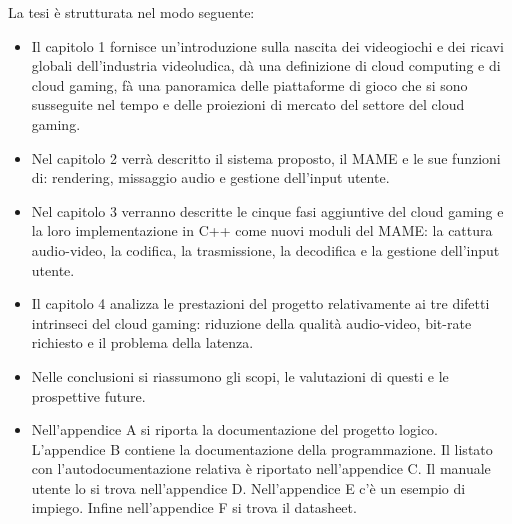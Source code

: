 
La tesi è strutturata nel modo seguente:
\begin{itemize}
	\item Il capitolo 1 fornisce un'introduzione sulla nascita dei videogiochi e dei ricavi globali dell'industria videoludica, dà una definizione di cloud computing e di cloud gaming, fà una panoramica delle piattaforme di gioco che si sono susseguite nel tempo e delle proiezioni di mercato del settore del cloud gaming.
	\item Nel capitolo 2 verrà descritto il sistema proposto, il MAME e le sue funzioni di: rendering, missaggio audio e gestione dell'input utente.
	\item Nel capitolo 3 verranno descritte le cinque fasi aggiuntive del cloud gaming e la loro implementazione in C++ come nuovi moduli del MAME: la cattura audio-video, la codifica, la trasmissione, la decodifica e la gestione dell'input utente.
	\item Il capitolo 4 analizza le prestazioni del progetto relativamente ai tre difetti intrinseci del cloud gaming: riduzione della qualità audio-video, bit-rate richiesto e il problema della latenza.
	\item Nelle conclusioni si riassumono gli scopi, le valutazioni di questi e le prospettive future.
	\item Nell'appendice A si riporta la documentazione del progetto logico. L'appendice B contiene la documentazione della programmazione. Il listato con l’autodocumentazione relativa è riportato nell'appendice C. Il manuale utente lo si trova nell'appendice D. Nell'appendice E c'è un esempio di impiego. Infine nell'appendice F si trova il datasheet.
\end{itemize}